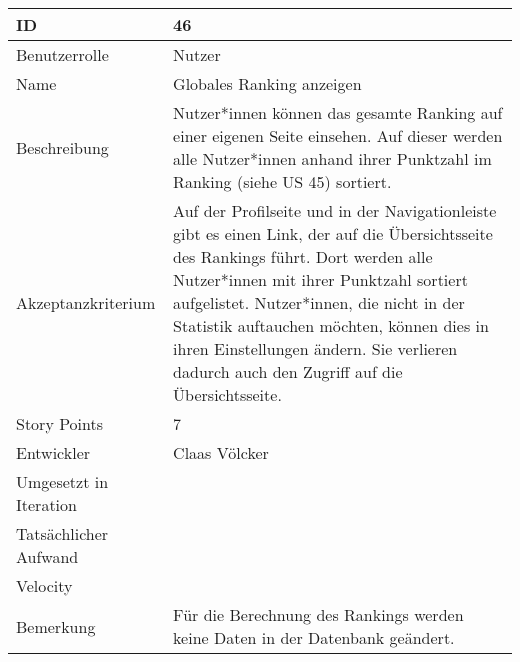 \begin{tabularx}{\textwidth}{|p{}|X|}
	\hline
	ID & 46\\
	\hline
	Benutzerrolle & Nutzer\\
	\hline
	Name & Globales Ranking anzeigen\\
	\hline
	Beschreibung & Nutzer*innen können das gesamte Ranking auf einer eigenen Seite einsehen. Auf dieser werden alle Nutzer*innen anhand ihrer Punktzahl im Ranking (siehe US 45) sortiert.\\
	\hline
	Akzeptanzkriterium & Auf der Profilseite und in der Navigationleiste gibt es einen Link, der auf die Übersichtsseite des Rankings führt. Dort werden alle Nutzer*innen mit ihrer Punktzahl sortiert aufgelistet. Nutzer*innen, die nicht in der Statistik auftauchen möchten, können dies in ihren Einstellungen ändern. Sie verlieren dadurch auch den Zugriff auf die Übersichtsseite.\\
	\hline
	Story Points & 7\\
	\hline
	Entwickler & Claas Völcker\\
	\hline
	Umgesetzt in Iteration & \\
	\hline
	Tatsächlicher Aufwand & \\
	\hline
	Velocity & \\
	\hline
	Bemerkung & Für die Berechnung des Rankings werden keine Daten in der Datenbank geändert.\\
	\hline
\end{tabularx}
\vspace{20pt}

